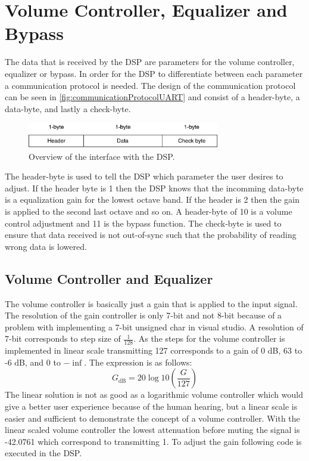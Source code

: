 \section{Volume Controller, Equalizer and Bypass}

The data that is received by the DSP are parameters for the volume controller, equalizer or bypass. In order for the DSP to differentiate between each parameter a communication protocol is needed. The design of the communication protocol can be seen in \autoref{fig:communicationProtocolUART} and consist of a header-byte, a data-byte, and lastly a check-byte. 
\begin{figure}[H]
\centering
\includegraphics[width=0.75\textwidth]{figures/communicationProtocolUART.pdf}
\caption{Overview of the interface with the DSP.}
\label{fig:communicationProtocolUART}
\end{figure}
The header-byte is used to tell the DSP which parameter the user desires to adjust. If the header byte is 1 then the DSP knows that the incomming data-byte is a equalization gain for the lowest octave band. If the header is 2 then the gain is applied to the second last octave and so on. A header-byte of 10 is a volume control adjustment and 11 is the bypass function. The check-byte is used to ensure that data received is not out-of-sync such that the probability of reading wrong data is lowered.

\subsection*{Volume Controller and Equalizer}
The volume controller is basically just a gain that is applied to the input signal. The resolution of the gain controller is only 7-bit and not 8-bit because of a problem with implementing a 7-bit unsigned char in visual studio. A resolution of 7-bit corresponds to step size of $\frac{1}{128}$. As the steps for the volume controller is implemented in linear scale transmitting 127 corresponds to a gain of 0 dB, 63 to -6 dB, and 0 to $-\inf$. The expression is as follows:
\begin{equation}
G_{\text{dB}} = 20 \log 10 \left( \frac{G}{127} \right)
\end{equation}
The linear solution is not as good as a logarithmic volume controller which would give a better user experience because of the human hearing, but a linear scale is easier and sufficient to demonstrate the concept of a volume controller. With the linear scaled volume controller the lowest attenuation before muting the signal is -42.0761 which correspond to transmitting 1. To adjust the gain following code is executed in the DSP.

